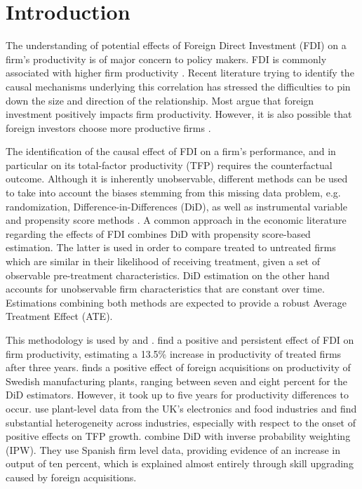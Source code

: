 \documentclass[a4paper,11pt]{scrartcl}
\newcommand{\sectionnumbering}[1]{%
  \setcounter{section}{0}%
   \renewcommand{\thesection}{\csname #1\endcsname{section}}}
\begin{document}
\sectionnumbering{arabic}

\section{Introduction}

The understanding of potential effects of Foreign Direct Investment (FDI) on a firm's productivity is of major concern to policy makers. FDI is commonly associated with higher firm productivity \citep{girma2007}. 
Recent literature trying to identify the causal mechanisms underlying this correlation has stressed the difficulties to pin down the size and direction of the relationship. Most argue that foreign investment positively impacts firm productivity. However, it is also possible that foreign investors choose more productive firms \citep{arnold2009}.

The identification of the causal effect of FDI on a firm’s performance, and 
in particular on its total-factor productivity (TFP) requires the counterfactual outcome. Although it is inherently unobservable, different methods can be used to take into account the biases stemming from this missing data problem, e.g. randomization, Difference-in-Differences (DiD), as well as instrumental variable and propensity score methods \citep{karpaty2007}. A common approach in the economic literature regarding the effects of FDI combines DiD with propensity score-based estimation. The latter is used in order to compare treated to untreated firms which are similar in their likelihood of receiving treatment, given a set of observable pre-treatment characteristics. 
DiD estimation on the other hand accounts for unobservable firm characteristics that are constant over time. Estimations combining both methods are expected to provide a robust Average Treatment Effect (ATE). 

This methodology is used by \citet{arnold2009, karpaty2007, girma2007} and \citet{schiffbauer2017}. \citet{arnold2009}  find a positive and persistent effect of FDI on firm productivity, estimating a 13.5\% increase in productivity of treated firms after three years. \citet{karpaty2007} finds a positive effect of foreign acquisitions on productivity of Swedish manufacturing plants, ranging between seven and eight percent for the DiD estimators. However, it took up to five years for productivity differences to occur. 
\citet{girma2007} use plant-level data from the UK's electronics and food industries and find substantial heterogeneity across industries, especially with respect to the onset of positive effects on TFP growth.  \citet{koch2019} combine DiD with inverse probability weighting (IPW). They use Spanish firm level data, providing evidence of an increase in output of ten percent, which is explained almost entirely through skill upgrading caused by foreign acquisitions. 
\end{document}
